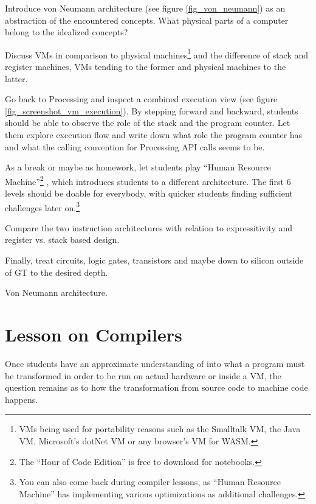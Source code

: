 \begin{instructions}
\item Introduce von Neumann architecture (see figure \ref{fig_von_neumann}) as an abstraction of the encountered concepts. What physical parts of a computer belong to the idealized concepts?
\item Discuss \acp{VM} in comparison to physical machines\footnote{\acp{VM} being used for portability reasons such as the Smalltalk \ac{VM}, the Java \ac{VM}, Microsoft's dotNet \ac{VM} or any browser's \ac{VM} for WASM.} and the difference of stack and register machines, \acp{VM} tending to the former and physical machines to the latter.
\item Go back to Processing and inspect a combined execution view (see figure \ref{fig_screenshot_vm_execution}). By stepping forward and backward, students should be able to observe the role of the stack and the program counter. Let them explore execution flow and write down what role the program counter has and what the calling convention for Processing \ac{API} calls seems to be.
\item As a break or maybe as homework, let students play ``Human Resource Machine''\footnote{The ``Hour of Code Edition'' is free to download for notebooks.} \cite{Tom15}, which introduces students to a different architecture. The first 6 levels should be doable for everybody, with quicker students finding sufficient challenges later on.\footnote{You can also come back during compiler lessons, as ``Human Resource Machine'' has implementing various optimizations as additional challenges.}
\item Compare the two instruction architectures with relation to expressitivity and register vs. stack based design.

\item Finally, treat circuits, logic gates, transistors and maybe down to silicon outside of \ac{GT} to the desired depth.
\end{instructions}

\begin{cfigure}{Von Neumann architecture.}

\end{cfigure}



\section{Lesson on Compilers} \label{sc_lesson_compiler}

Once students have an approximate understanding of into what a program must be transformed in order to be run on actual hardware or inside a \ac{VM}, the question remains as to how the transformation from source code to machine code happens.


